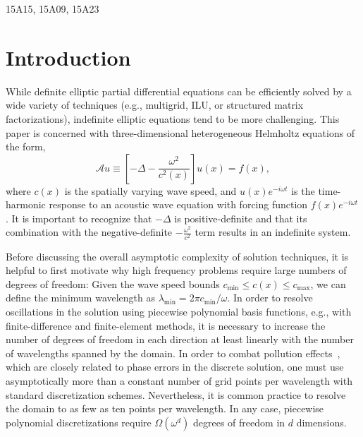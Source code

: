 \begin{AMS}
15A15, 15A09, 15A23
\end{AMS}

\pagestyle{myheadings}
\thispagestyle{plain}

\section{Introduction}
\label{section:intro}
While definite elliptic partial differential equations can be efficiently 
solved by a wide variety of techniques (e.g., multigrid, ILU, or structured 
matrix factorizations), indefinite elliptic equations tend to be more 
challenging. 
This paper is concerned with three-dimensional heterogeneous Helmholtz 
equations of the form,
\begin{equation}\label{helmholtz}
  \mathcal{A} u \equiv 
  \left[-\Delta - \frac{\omega^2}{c^2(x)}\right] u(x) =f(x),
\end{equation}
where $c(x)$ is the spatially varying wave speed, and $u(x) e^{-i \omega t}$ 
is the time-harmonic response to an acoustic wave equation with forcing 
function $f(x) e^{-i \omega t}$.
It is important to recognize that $-\Delta$ is positive-definite and that 
its combination with the negative-definite $-\frac{\omega^2}{c^2}$ term 
results in an indefinite system.

Before discussing the overall asymptotic complexity of solution techniques,
it is helpful to first motivate why high frequency problems require large 
numbers of degrees of freedom: Given the wave speed bounds 
$c_{\text{min}} \le c(x) \le c_{\text{max}}$, we can define the minimum 
wavelength as $\lambda_{\text{min}} = 2 \pi c_{\text{min}}/\omega$.
In order to resolve oscillations in the solution using piecewise polynomial 
basis functions, e.g., with finite-difference and finite-element methods, it is 
necessary to increase the number of degrees of freedom in each direction at 
least linearly with the number of wavelengths spanned by the domain. In order
to combat pollution effects~\cite{Babuska-pollution}, which are closely related 
to phase errors in the discrete solution, one must use asymptotically more
than a constant number of grid points per wavelength with standard 
discretization schemes. Nevertheless, it is common practice to resolve the 
domain to as few as ten points per wavelength. 
In any case, piecewise polynomial discretizations require $\Omega(\omega^d)$
degrees of freedom in $d$ dimensions.

